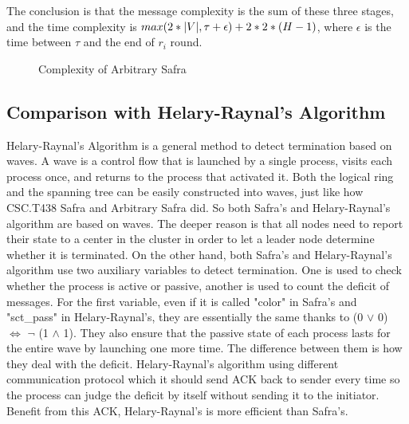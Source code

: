 \documentclass{article}
\begin{document}
The conclusion is that the message complexity is the sum of these three stages, and the time complexity is $max(2 * \lvert V \rvert, \tau + \epsilon) + 2 * 2 * (H - 1)$, where $\epsilon$ is the time between $\tau$ and the end of $r_i$ round.

\begin{figure}[htb]
  \centering
  \caption{Complexity of Arbitrary Safra}
\end{figure}

\subsection{Comparison with Helary-Raynal's Algorithm\cite[][]{raynal2013distributed}}
Helary-Raynal's Algorithm is a general method to detect termination based on waves. A wave is a control flow that is launched by a single process, visits each process once, and returns to the process that activated it\citep[][]{raynal2013distributed}. Both the logical ring and the spanning tree can be easily constructed into waves, just like how CSC.T438 Safra and Arbitrary Safra did. So both Safra's and Helary-Raynal's algorithm are based on waves. The deeper reason is that all nodes need to report their state to a center in the cluster in order to let a leader node determine whether it is terminated. On the other hand, both Safra's and Helary-Raynal's algorithm use two auxiliary variables to detect termination. One is used to check whether the process is active or passive, another is used to count the deficit of messages. For the first variable, even if it is called "color" in Safra's and "sct\_pass" in Helary-Raynal's, they are essentially the same thanks to (0 $\lor$ 0) $\Leftrightarrow$ $\neg$ (1 $\land$ 1). They also ensure that the passive state of each process lasts for the entire wave by launching one more time. The difference between them is how they deal with the deficit. Helary-Raynal's algorithm using different communication protocol which it should send ACK back to sender every time so the process can judge the deficit by itself without sending it to the initiator. Benefit from this ACK, Helary-Raynal's is more efficient than Safra's.
\end{document}
